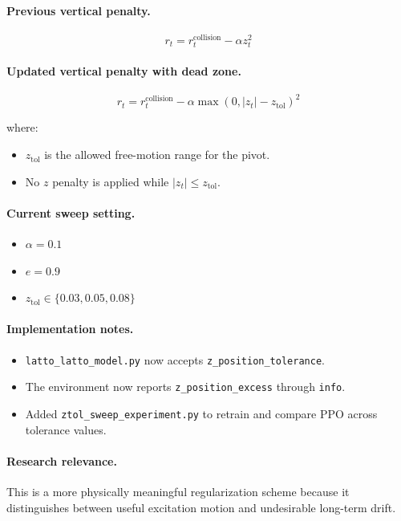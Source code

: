 \documentclass[11pt]{article}
\begin{document}
\paragraph{Previous vertical penalty.}
\[
r_t = r_t^{\mathrm{collision}} - \alpha z_t^2
\]

\paragraph{Updated vertical penalty with dead zone.}
\[
r_t = r_t^{\mathrm{collision}} - \alpha \max(0, |z_t| - z_{\mathrm{tol}})^2
\]

where:
\begin{itemize}[leftmargin=1.5em]
  \item $z_{\mathrm{tol}}$ is the allowed free-motion range for the pivot.
  \item No $z$ penalty is applied while $|z_t| \le z_{\mathrm{tol}}$.
\end{itemize}

\paragraph{Current sweep setting.}
\begin{itemize}[leftmargin=1.5em]
  \item $\alpha = 0.1$
  \item $e = 0.9$
  \item $z_{\mathrm{tol}} \in \{0.03, 0.05, 0.08\}$
\end{itemize}

\paragraph{Implementation notes.}
\begin{itemize}[leftmargin=1.5em]
  \item \texttt{latto\_latto\_model.py} now accepts \texttt{z\_position\_tolerance}.
  \item The environment now reports \texttt{z\_position\_excess} through \texttt{info}.
  \item Added \texttt{ztol\_sweep\_experiment.py} to retrain and compare PPO across tolerance values.
\end{itemize}

\paragraph{Research relevance.}
This is a more physically meaningful regularization scheme because it distinguishes between useful excitation motion and undesirable long-term drift.
\end{document}
